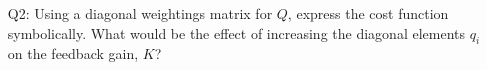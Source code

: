 \begin{enumerate}
    \item[Q2:] Using a diagonal weightings matrix for $Q$, express the cost function symbolically. What would be the effect of increasing the diagonal elements $q_i$ on the feedback gain, $K$?\\

\end{enumerate}
